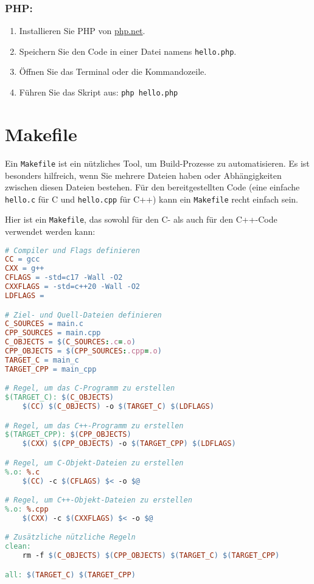 \documentclass[12pt,a4paper]{scrartcl}
\newcommand{\tightlist}{
  \setlength{\itemsep}{0pt}\setlength{\parskip}{0pt}
}
\begin{document}
\hypertarget{php}{%
\subsubsection{PHP:}\label{php}}

\begin{enumerate}
\def\labelenumi{\arabic{enumi}.}
\tightlist
\item
  Installieren Sie PHP von \href{https://www.php.net/}{php.net}.
\item
  Speichern Sie den Code in einer Datei namens
  {\lstinline!hello.php!}.
\item
  Öffnen Sie das Terminal oder die Kommandozeile.
\item
  Führen Sie das Skript aus: {\lstinline!php hello.php!}
\end{enumerate}

\hypertarget{makefile}{%
\section{Makefile}\label{makefile}}

Ein {\lstinline!Makefile!} ist ein nützliches Tool, um
Build-Prozesse zu automatisieren. Es ist besonders hilfreich, wenn Sie
mehrere Dateien haben oder Abhängigkeiten zwischen diesen Dateien
bestehen. Für den bereitgestellten Code (eine einfache
{\lstinline!hello.c!} für C und
{\lstinline!hello.cpp!} für C++) kann ein
{\lstinline!Makefile!} recht einfach sein.

Hier ist ein {\lstinline!Makefile!}, das sowohl für den C-
als auch für den C++-Code verwendet werden kann:

\begin{lstlisting}[language=make]
# Compiler und Flags definieren
CC = gcc
CXX = g++
CFLAGS = -std=c17 -Wall -O2
CXXFLAGS = -std=c++20 -Wall -O2
LDFLAGS = 

# Ziel- und Quell-Dateien definieren
C_SOURCES = main.c
CPP_SOURCES = main.cpp
C_OBJECTS = $(C_SOURCES:.c=.o)
CPP_OBJECTS = $(CPP_SOURCES:.cpp=.o)
TARGET_C = main_c
TARGET_CPP = main_cpp

# Regel, um das C-Programm zu erstellen
$(TARGET_C): $(C_OBJECTS)
    $(CC) $(C_OBJECTS) -o $(TARGET_C) $(LDFLAGS)

# Regel, um das C++-Programm zu erstellen
$(TARGET_CPP): $(CPP_OBJECTS)
    $(CXX) $(CPP_OBJECTS) -o $(TARGET_CPP) $(LDFLAGS)

# Regel, um C-Objekt-Dateien zu erstellen
%.o: %.c
    $(CC) -c $(CFLAGS) $< -o $@

# Regel, um C++-Objekt-Dateien zu erstellen
%.o: %.cpp
    $(CXX) -c $(CXXFLAGS) $< -o $@

# Zusätzliche nützliche Regeln
clean:
    rm -f $(C_OBJECTS) $(CPP_OBJECTS) $(TARGET_C) $(TARGET_CPP)

all: $(TARGET_C) $(TARGET_CPP)
\end{lstlisting}
\end{document}

